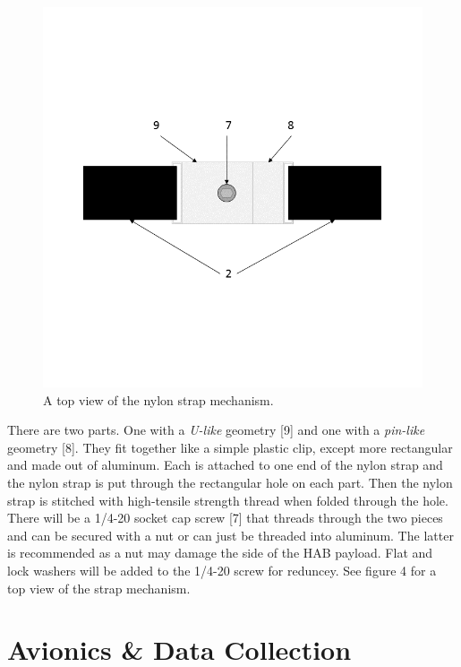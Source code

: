 \documentclass[journal]{SPEXformat}
\begin{document}
\begin{figure}
  \includegraphics[width = \linewidth]{figs/Nylon-Aluminum-Top-Fig.png}
  \caption{A top view of the nylon strap mechanism.}
\label{fig: Nylon Strap Top View}
\end{figure}

  There are two parts. One with a \textit{U-like} geometry [9] and one with a \textit{pin-like} geometry [8]. They fit together
  like a simple plastic clip, except more rectangular and made out of aluminum. Each is attached to one end of the nylon
  strap and the nylon strap is put through the rectangular hole on each part. Then the nylon strap is stitched with high-tensile
  strength thread when folded through the hole. There will be a 1/4-20 socket cap screw [7] that threads through the two pieces and can be secured with a nut or can
  just be threaded into aluminum. The latter is recommended as a nut may damage the side of the HAB payload. Flat and
  lock washers will be added to the 1/4-20 screw for reduncey. See figure 4 for a top view of the strap mechanism.

\section{Avionics \& Data Collection}
\label{sec: avionics and data collection}
\end{document}
